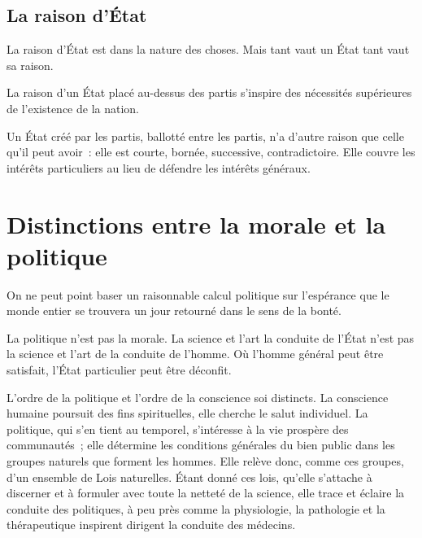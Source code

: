 \documentclass[french,twoside]{book} %
\newcommand{\astermono}{\medskip\centerline{\color{rubric}\large\selectfont{\syms ✻}}\medskip\par}%
\begin{document}
\astermono

\subsection[{La raison d’État}]{La raison d’État}
\noindent La raison d’État est dans la nature des choses. Mais tant vaut un État tant vaut sa raison.\par
La raison d’un État placé au-dessus des partis s’inspire des nécessités supérieures de l’existence de la nation.\par
Un État créé par les partis, ballotté entre les partis, n’a d’autre raison que celle qu’il peut avoir : elle est courte, bornée, successive, contradictoire. Elle couvre les intérêts particuliers au lieu de défendre les intérêts généraux.
\section[{Distinctions entre la morale et la politique}]{Distinctions entre la morale et la politique}
\noindent On ne peut point baser un raisonnable calcul politique sur l’espérance que le monde entier se trouvera un jour retourné dans le sens de la bonté.\par

\astermono

\noindent La politique n’est pas la morale. La science et l’art la conduite de l’État n’est pas la science et l’art de la conduite de l’homme. Où l’homme général peut être satisfait, l’État particulier peut être déconfit.\par

\astermono

\noindent L’ordre de la politique et l’ordre de la conscience soi distincts. La conscience humaine poursuit des fins spirituelles, elle cherche le salut individuel. La politique, qui s’en tient au temporel, s’intéresse à la vie prospère des communautés ; elle détermine les conditions générales du bien public dans les groupes naturels que forment les hommes. Elle relève donc, comme ces groupes, d’un ensemble de Lois naturelles. Étant donné ces lois, qu’elle s’attache à discerner et à formuler avec toute la netteté de la science, elle trace et éclaire la conduite des politiques, à peu près comme la physiologie, la pathologie et la thérapeutique inspirent dirigent la conduite des médecins.\par

\astermono
\end{document}

